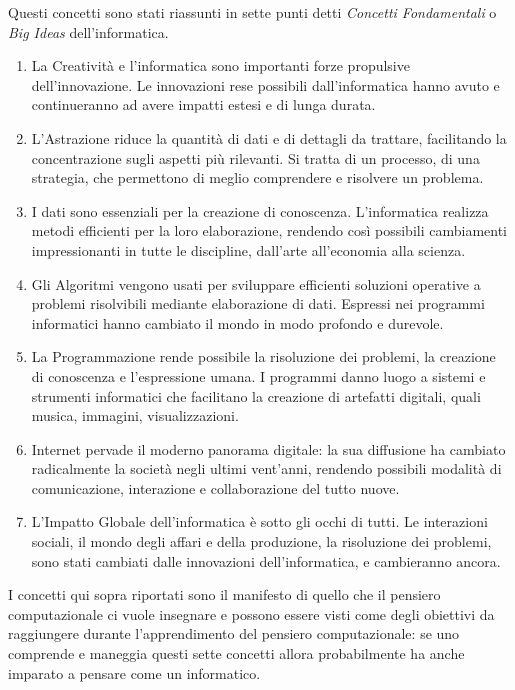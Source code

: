 \documentclass[11pt,a4paper]{article}
\begin{document}
Questi concetti sono stati riassunti in sette punti detti
\emph{Concetti Fondamentali} o \emph{Big Ideas} dell'informatica.
\begin{enumerate}
    \item La Creatività e l'informatica sono importanti forze
      propulsive dell'innovazione. Le innovazioni rese possibili
      dall'informatica hanno avuto e continueranno ad avere impatti
      estesi e di lunga durata.
    \item L'Astrazione riduce la quantità di dati e di dettagli da
      trattare, facilitando la concentrazione sugli aspetti più
      rilevanti. Si tratta di un processo, di una strategia, che
      permettono di meglio comprendere e risolvere un problema.
    \item I dati sono essenziali per la creazione di
      conoscenza. L'informatica realizza metodi efficienti per la loro
      elaborazione, rendendo così possibili cambiamenti impressionanti
      in tutte le discipline, dall'arte all'economia alla scienza.
    \item Gli Algoritmi vengono usati per sviluppare efficienti
      soluzioni operative a problemi risolvibili mediante elaborazione
      di dati. Espressi nei programmi informatici hanno cambiato il
      mondo in modo profondo e durevole.
    \item La Programmazione rende possibile la risoluzione dei
      problemi, la creazione di conoscenza e l'espressione umana. I
      programmi danno luogo a sistemi e strumenti informatici che
      facilitano la creazione di artefatti digitali, quali musica,
      immagini, visualizzazioni.
    \item Internet pervade il moderno panorama digitale: la sua
      diffusione ha cambiato radicalmente la società negli ultimi
      vent'anni, rendendo possibili modalità di comunicazione,
      interazione e collaborazione del tutto nuove.
    \item L'Impatto Globale dell'informatica è sotto gli occhi di
      tutti. Le interazioni sociali, il mondo degli affari e della
      produzione, la risoluzione dei problemi, sono stati cambiati
      dalle innovazioni dell'informatica, e cambieranno ancora.
\end{enumerate}
I concetti qui sopra riportati sono il manifesto di quello che il
pensiero computazionale ci vuole insegnare e possono essere visti come
degli obiettivi da raggiungere durante l'apprendimento del pensiero
computazionale: se uno comprende e maneggia questi sette concetti
allora probabilmente ha anche imparato a pensare come un informatico.
\end{document}

